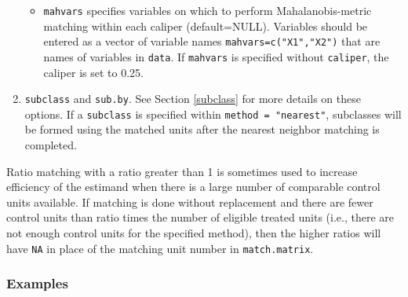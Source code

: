 \documentclass[oneside,letterpaper,titlepage]{article}
\begin{document}
\begin{enumerate}
\begin{itemize}
  \item \texttt{mahvars} specifies variables on which to perform
    Mahalanobis-metric matching within each caliper (default=NULL).
    Variables should be entered as a vector of variable names
    \texttt{mahvars=c("X1","X2")} that are names of variables in
    \texttt{data}.  If \texttt{mahvars} is specified without
    \texttt{caliper}, the caliper is set to 0.25.
  \end{itemize}
\item \texttt{subclass} and \texttt{sub.by}.  See Section
  \ref{subclass} for more details on these options.  If a
  \texttt{subclass} is specified within \texttt{method = "nearest"},
  subclasses will be formed using the matched units after the nearest
  neighbor matching is completed.
\end{enumerate}

Ratio matching with a ratio greater than 1 is sometimes used to
increase efficiency of the estimand when there is a large number of
comparable control units available. If matching is done without
replacement and there are fewer control units than ratio times the
number of eligible treated units (i.e., there are not enough control
units for the specified method), then the higher ratios will have
\texttt{NA} in place of the matching unit number in
\texttt{match.matrix}.

\subsubsection{Examples}
\end{document}
